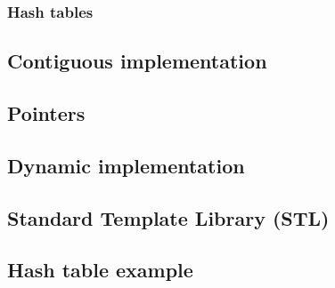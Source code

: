 \subsubsection{Hash tables}

\subsection{Contiguous implementation}

\subsection{Pointers}

\subsection{Dynamic implementation}

\subsection{Standard Template Library (STL)}

\subsection{Hash table example}